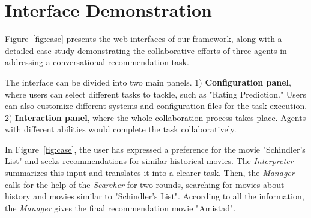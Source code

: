 \section{Interface Demonstration}

Figure~\ref{fig:case} presents the web interfaces of our framework, along with a detailed case study demonstrating the collaborative efforts of three agents in addressing a conversational recommendation task. 

The interface can be divided into two main panels. 
1) \textbf{Configuration panel}, where users can select different tasks to tackle, such as "Rating Prediction." Users can also customize different systems and configuration files for the task execution. 
2) \textbf{Interaction panel}, where the whole collaboration process takes place. Agents with different abilities would complete the task collaboratively.

In Figure~\ref{fig:case}, the user has expressed a preference for the movie "Schindler's List" and seeks recommendations for similar historical movies. 
The \textsl{Interpreter} summarizes this input and translates it into a clearer task.
Then, the \textsl{Manager} calls for the help of the \textsl{Searcher} for two rounds, searching for movies about history and movies similar to "Schindler's List".
According to all the information, the \textsl{Manager} gives the final recommendation movie "Amistad".







